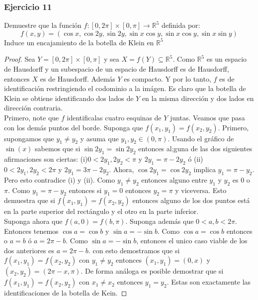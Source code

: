 \documentclass[letterpaper]{article}
\begin{document}
\subsubsection*{Ejercicio 11}
Demuestre que  la funci\'on  $f:[0,2\pi ]\times [0,\pi ] \rightarrow \mathbb{R}^5$ definida por:
\begin{equation*}
f(x,y)=(\cos x, \cos 2y, \sin  2y, \sin x  \cos y,  \sin x  \cos y, \sin x \sin y)
\end{equation*}
Induce un encajamiento de la botella de Klein en $\mathbb{R}^5$
\begin{proof}
Sea $Y=[0,2\pi ]\times [0,\pi]$ y sea $X=f(Y)\subseteq \mathbb{R}^5$. Como   $\mathbb{R}^5$ es un espacio de Hausdorff y un subespacio de un espacio de Hausdorff es de Hausdorff, entonces $X$ es de Hausdorff. Adem\'as $Y$ es compacto. Y por lo tanto, $f$ es de identificaci\'on restringiendo el  codominio a la im\'agen. Es claro  que la botella de Klein se obtiene identificando dos lados de $Y$  en la misma  direcci\'on y dos lados en direcci\'on contraria.\\
Primero, note que $f$ identificalas cuatro esquinas de $Y$ juntas. Veamos que pasa con los dem\'as puntos del borde.
Suponga que $f(x_1,y_1)=f(x_2,y_2)$. Primero, supongamos  que $y_1 \neq   y_2$ y asuma que  $y_1, y_2 \in (0,\pi).$  Usando el gr\'afico de   $\sin(x)$ sabemos que si $\sin 2y_1=\sin 2y_2$ entonces  al;guna  de las dos siguientes afirmaciones son  ciertas: (i)$0<2y_1, 2y_2<\pi$ y $2y_1=\pi-2y_2$ \'o (ii)$0<2y_1, 2y_2<2\pi$ y $2y_1=3\pi-2y_2$. Ahora, $\cos 2y_1=\cos 2y_2$ implica $y_1=\pi-y_2$.  Pero esto contradice (i) y (ii). Como $y_1 \neq   y_2$ entonces alguno entre $y_1$ y $y_2$ es $0$ o $\pi$. Como $y_1=\pi-y_2$ entonces si $y_1=0$ entonces $y_2=\pi$ y viceversa. Esto demuestra que si $f(x_1,y_1)=f(x_2,y_2)$ entonces alguno de los dos puntos est\'a en la parte superior del rect\'angulo y el otro en la parte inferior.\\
Suponga ahora que $f(a,0)=f(b,\pi)$. Suponga adem\'as que $0<a,b<2\pi$. Entonces tenemos $\cos a =\cos b$ y $\sin a=-\sin b$. Como $\cos a =\cos b$ entonces o $a=b$ \'o $a=2\pi-b$. Como $\sin a=-\sin b$, entonces el unico caso viable de los dos anteriores es $a=2\pi-b$. con esto demostramos que si $f(x_1,y_1)=f(x_2,y_2)$ con  $y_1\neq y_2$ entonces $(x_1,y_1)=(0,x)$ y $(x_2,y_2)=(2\pi-x,\pi)$.
De forma an\'aloga es posible demostrar que si $f(x_1,y_1)=f(x_2,y_2)$ con  $x_1\neq x_2$ entonces $y_1=y_2$. Estas son exactamente las identificaciones de la botella de Kein.
\end{proof}
\end{document}
